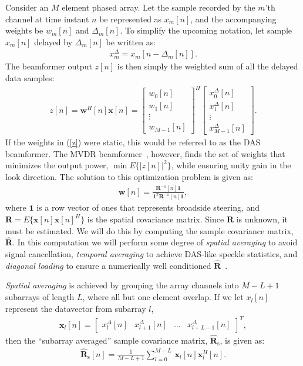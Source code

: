 \documentclass[10pt,a4paper]{article}
\newcommand\bmat[1]{\begin{bmatrix}#1\end{bmatrix}}
\newcommand\sumb[2]{\sum\limits_{#1}^{#2}\,}
\newcommand\T{^{\scriptscriptstyle T}}
\renewcommand\H{^{\scriptscriptstyle H}}
\renewcommand\vec[1]{\boldsymbol{#1}}
\newcommand\mat[1]{\boldsymbol{#1}}
\newcommand\1{\vec 1}
\newcommand*\w{\vec w}
\newcommand*\x{\vec x}
\newcommand*\R{\mat R}
\newcommand*\Ri{\R^{-1}}
\newcommand*\eR{\mat{\hat R}}
\begin{document}
Consider an $M$ element phased array. Let the sample recorded by the $m$'th channel at time instant $n$ be represented as $x_m[n]$, and the accompanying weights be  $w_m[n]$ and $\Delta_m[n]$. To simplify the upcoming notation, let sample $x_m[n]$ delayed by $\Delta_m[n]$ be written as:
\begin{align}
x^\Delta_m = x_m[n-\Delta_m[n]].
\end{align}
The beamformer output $z[n]$ is then simply the weighted sum of all the delayed data samples:
\begin{align}
z[n] = \w\H[n]\x[n] = \bmat{w_0[n]\\w_1[n]\\\vdots\\w_{M-1}[n]}^H \bmat{x^\Delta_0[n]\\x^\Delta_1[n]\\\vdots\\x^\Delta_{M-1}[n]}.\label{z}
\end{align}
If the weights in (\ref{z}) were static, this would be referred to as the \gls{DAS} beamformer. The \gls{MVDR} beamformer~\cite{Capon1969}, however, finds the set of weights that minimizes the output power, $\min E\{|z[n]|^2\}$, while ensuring unity gain in the look direction. The solution to this optimization problem is given as:
\begin{gather}
\vec w[n] = \frac{\Ri[n]\1}{\1\T\Ri[n]\1},\label{weights}
\end{gather}
where $\1$ is a row vector of ones that represents broadside steering, and $\R=E\{\x[n]\x[n]\H\}$ is the spatial covariance matrix. Since $\R$ is unknown, it must be estimated. We will do this by computing the sample covariance matrix, $\eR$. In this computation we will perform some degree of \emph{spatial averaging} to avoid signal cancellation, \emph{temporal averaging} to achieve \gls{DAS}-like speckle statistics, and \emph{diagonal loading} to ensure a numerically well conditioned $\eR$~\cite{Synnevag2009a}.

\emph{Spatial averaging} is achieved by grouping the array channels into $M-L+1$ subarrays of length $L$, where all but one element overlap. If we let $x_l[n]$ represent the datavector from subarray $l$,
\begin{gather}
\x_l[n] = \bmat{x^\Delta_l[n] & x^\Delta_{l+1}[n] & \dots & x^\Delta_{l+L-1}[n]}\T,
\end{gather}
then the ``subarray averaged'' sample covariance matrix, $\eR_\text{s}$, is given as:
\begin{gather}
\eR_\text{s}[n] = \frac{1}{M-L+1} \sumb{l=0}{M-L} \x_l[n]\x_l\H[n].\label{spatialR}
\end{gather}
\end{document}
